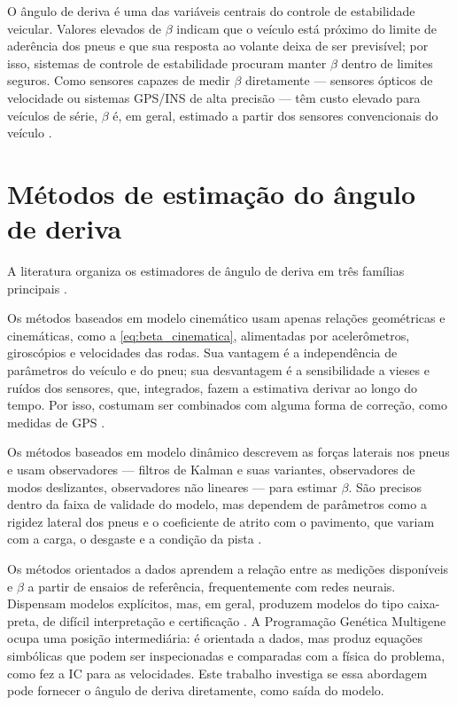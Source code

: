 O ângulo de deriva é uma das variáveis centrais do controle de estabilidade veicular. Valores elevados de $\beta$ indicam que o veículo está próximo do limite de aderência dos pneus e que sua resposta ao volante deixa de ser previsível; por isso, sistemas de controle de estabilidade procuram manter $\beta$ dentro de limites seguros. Como sensores capazes de medir $\beta$ diretamente --- sensores ópticos de velocidade ou sistemas GPS/INS de alta precisão --- têm custo elevado para veículos de série, $\beta$ é, em geral, estimado a partir dos sensores convencionais do veículo \cite{chindamo2018}.

\section{Métodos de estimação do ângulo de deriva}\label{sec:metodos_estimacao}

A literatura organiza os estimadores de ângulo de deriva em três famílias principais \cite{chindamo2018, liu2018}.

Os métodos baseados em modelo cinemático usam apenas relações geométricas e cinemáticas, como a \autoref{eq:beta_cinematica}, alimentadas por acelerômetros, giroscópios e velocidades das rodas. Sua vantagem é a independência de parâmetros do veículo e do pneu; sua desvantagem é a sensibilidade a vieses e ruídos dos sensores, que, integrados, fazem a estimativa derivar ao longo do tempo. Por isso, costumam ser combinados com alguma forma de correção, como medidas de GPS \cite{liu2018}.

Os métodos baseados em modelo dinâmico descrevem as forças laterais nos pneus e usam observadores --- filtros de Kalman e suas variantes, observadores de modos deslizantes, observadores não lineares --- para estimar $\beta$. São precisos dentro da faixa de validade do modelo, mas dependem de parâmetros como a rigidez lateral dos pneus e o coeficiente de atrito com o pavimento, que variam com a carga, o desgaste e a condição da pista \cite{puscul2024}.

Os métodos orientados a dados aprendem a relação entre as medições disponíveis e $\beta$ a partir de ensaios de referência, frequentemente com redes neurais. Dispensam modelos explícitos, mas, em geral, produzem modelos do tipo caixa-preta, de difícil interpretação e certificação \cite{chindamo2018}. A Programação Genética Multigene ocupa uma posição intermediária: é orientada a dados, mas produz equações simbólicas que podem ser inspecionadas e comparadas com a física do problema, como fez a IC para as velocidades. Este trabalho investiga se essa abordagem pode fornecer o ângulo de deriva diretamente, como saída do modelo.


